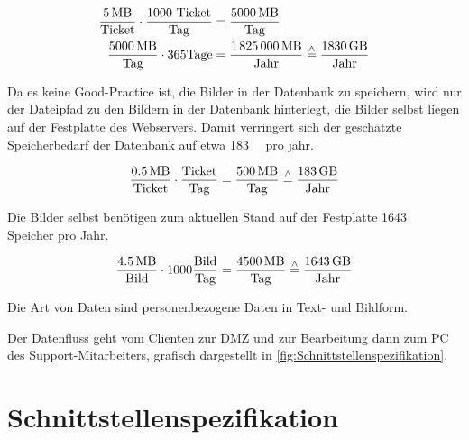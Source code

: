 \documentclass[a4paper,12pt,headings=small,ngerman,bibliography=totoc]{scrartcl}
\begin{document}
\begin{align*}
  \frac{\SI{5}{\mega\byte}}{\text{Ticket}} \cdot \frac{1000\text{ Ticket}}{\text{Tag}} & = \frac{\SI{5000}{\mega\byte}}{\text{Tag}}                                                                  \\
  \frac{\SI{5000}{\mega\byte}}{\text{Tag}} \cdot 365 \text{Tage}                       & = \frac{\SI{1825000}{\mega\byte}}{\text{Jahr}} \stackrel{\wedge}= \frac{\SI{1830}{\giga\byte}}{\text{Jahr}}
\end{align*}


Da es keine Good-Practice ist, die Bilder in der Datenbank zu speichern, wird nur der Dateipfad zu den Bildern in der Datenbank hinterlegt, die Bilder selbst liegen auf der Festplatte des Webservers. Damit verringert sich der geschätzte Speicherbedarf der Datenbank auf etwa \SI{183}{\giga\byte} pro jahr.

\begin{align*}
  \frac{\SI{0.5}{\mega\byte}}{\text{Ticket}} \cdot \frac{\text{Ticket}}{\text{Tag}} = \frac{\SI{500}{\mega\byte}}{\text{Tag}} \stackrel{\wedge}= \frac{\SI{183}{\giga\byte}}{\text{Jahr}}
\end{align*}

Die Bilder selbst benötigen zum aktuellen Stand auf der Festplatte \SI{1643}{\giga\byte} Speicher pro Jahr.

\begin{align*}
  \frac{\SI{4.5}{\mega\byte}}{\text{Bild}} \cdot 1000 \frac{\text{Bild}}{\text{Tag}} = \frac{\SI{4500}{\mega\byte}}{\text{Tag}} \stackrel{\wedge}= \frac{\SI{1643}{\giga\byte}}{\text{Jahr}}
\end{align*}

Die Art von Daten sind personenbezogene Daten in Text- und Bildform.

Der Datenfluss geht vom Clienten zur DMZ und zur Bearbeitung dann zum PC des Support-Mitarbeiters, grafisch dargestellt in \vref{fig:Schnittstellenspezifikation}.


\newpage
\section{Schnittstellenspezifikation}
\end{document}
